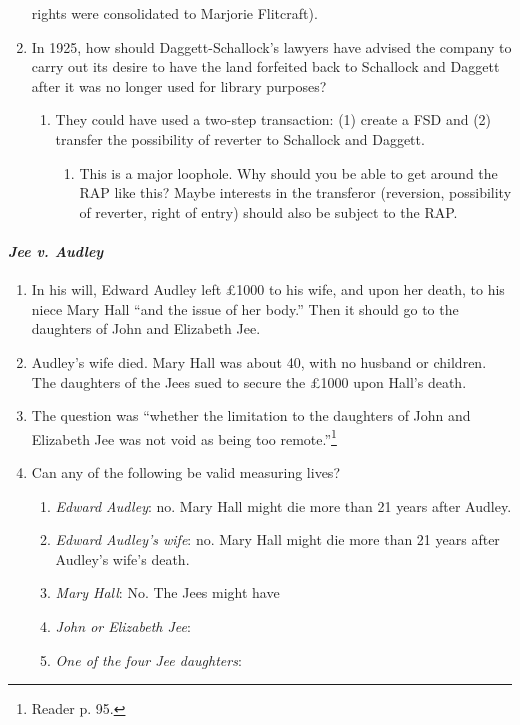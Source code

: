 \begin{enumerate}
    rights were consolidated to Marjorie Flitcraft).
    \item In 1925, how should Daggett-Schallock's lawyers have advised the 
    company to carry out its desire to have the land forfeited back to 
    Schallock and Daggett after it was no longer used for library purposes?
    \begin{enumerate}
        \item They could have used a two-step transaction: (1) create a FSD 
        and (2) transfer the possibility of reverter to Schallock and Daggett.
        \begin{enumerate}
            \item This is a major loophole. Why should you be able to get 
            around the RAP like this? Maybe interests in the transferor 
            (reversion, possibility of reverter, right of entry) should also 
            be subject to the RAP.
        \end{enumerate}
    \end{enumerate}
\end{enumerate}

\paragraph{\emph{Jee v. Audley}}


\begin{enumerate}
    \item In his will, Edward Audley left \pounds 1000 to his wife, and upon 
    her death, to his niece Mary Hall ``and the issue of her body.'' Then it 
    should go to the daughters of John and Elizabeth Jee.
    \item Audley's wife died. Mary Hall was about 40, with no husband or 
    children. The daughters of the Jees sued to secure the \pounds 1000 upon 
    Hall's death.
    \item The question was ``whether the limitation to the daughters of John 
    and Elizabeth Jee was not void as being too remote.''\footnote{Reader p. 
    95.}
    \item Can any of the following be valid measuring lives?
    \begin{enumerate}
        \item \emph{Edward Audley}: no. Mary Hall might die more than 21 years 
        after Audley.
        \item \emph{Edward Audley's wife}: no. Mary Hall might die more than 
        21 years after Audley's wife's death.
        \item \emph{Mary Hall}: No. The Jees might have 
        \item \emph{John or Elizabeth Jee}:
        \item \emph{One of the four Jee daughters}:
    \end{enumerate}
\end{enumerate}

